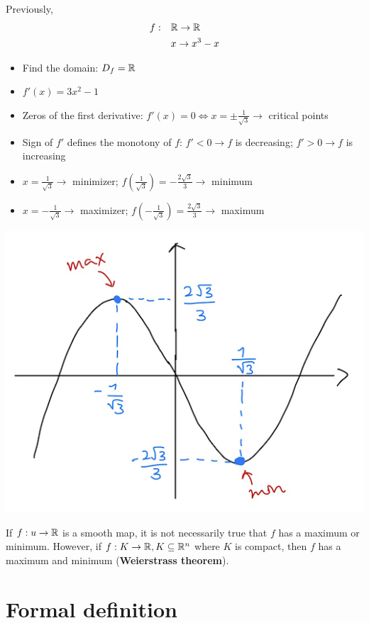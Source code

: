 Previously,
\begin{equation*}
    \begin{split}
        f: & \quad\mathbb{R}\to\mathbb{R}\\
        & \quad x\to x^3-x
    \end{split}
\end{equation*}
\begin{itemize}
    \item Find the domain: $D_f = \mathbb{R}$
    \item $f'(x) = 3x^2-1$
    \item Zeros of the first derivative: $f'(x)=0\Leftrightarrow x=\pm\frac{1}{\sqrt{3}} \to$ critical points
    \item Sign of $f'$ defines the monotony of $f$: $f'<0\to f$ is decreasing; $f'>0\to f$ is increasing
    \item $x=\frac{1}{\sqrt{3}}\to$ minimizer; $f(\frac{1}{\sqrt{3}})=-\frac{2\sqrt{3}}{3}\to$ minimum
    \item $x=-\frac{1}{\sqrt{3}}\to$ maximizer; $f(-\frac{1}{\sqrt{3}})=\frac{2\sqrt{3}}{3}\to$ maximum
\end{itemize}
\begin{center}
    \includegraphics[scale=0.5]{Images/22.png}
\end{center}

If $f: u\to\mathbb{R}$ is a smooth map, it is not necessarily true that $f$ has a maximum or minimum.
However, if $f: K\to\mathbb{R}, K\subseteq\mathbb{R}^n$ where $K$ is compact, then $f$ has a maximum and minimum (\textbf{Weierstrass theorem}).

\section{Formal definition}



